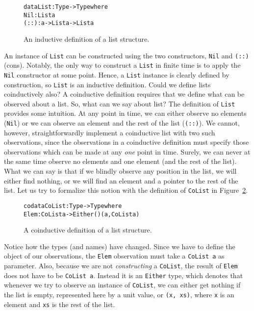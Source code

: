 \begin{figure}
\begin{alltt}
data List : Type -> Type where
  Nil  : List a 
  (::) : a  -> List a -> List a
\end{alltt}
\caption{An inductive definition of a list structure.}
\label{fig:inductive_list}
\end{figure}

An instance of \texttt{List} can be constructed using the two constructors, \texttt{Nil} and \texttt{(::)} (cons). Notably, the only way to construct a \texttt{List} in finite time is to apply the \texttt{Nil} constructor at some point. Hence, a \texttt{List} instance is clearly defined by construction, so \texttt{List} is an inductive definition. Could we define lists coinductively also? A coinductive definition requires that we define what can be observed about a list. So, what can we say about list? The definition of \texttt{List} provides some intuition. At any point in time, we can either observe no elements (\texttt{Nil}) or we can observe an element and the rest of the list (\texttt{(::)}). We cannot, however, straightforwardly implement a coinductive list with two such observations, since the observations in a coinductive definition must specify those observations which can be made at any \emph{one} point in time. Surely, we can never at the same time observe no elements and one element (and the rest of the list). What we can say is that if we blindly observe any position in the list, we will either find nothing, or we will find an element and a pointer to the rest of the list. Let us try to formalize this notion with the definition of \texttt{CoList} in Figure~\ref{fig:CoList}.

\begin{figure}
\begin{alltt}
codata CoList : Type -> Type where
  Elem : CoList a -> Either () (a, CoList a)
\end{alltt}
\caption{A coinductive definition of a list structure.}
\label{fig:CoList}
\end{figure}



Notice how the types (and names) have changed. Since we have to define the object of our observations, the \texttt{Elem} observation must take a \texttt{CoList a} as parameter. Also, because we are not \emph{constructing} a \texttt{CoList}, the result of \texttt{Elem} does not have to be \texttt{CoList~a}. Instead it is an \texttt{Either} type, which denotes that whenever we try to observe an instance of \texttt{CoList}, we can either get nothing if the list is empty, represented here by a unit value, or \texttt{(x, xs)}, where \texttt{x} is an element and \texttt{xs} is the rest of the list. 

